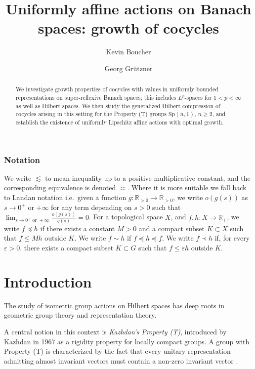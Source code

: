 \documentclass[12pt]{amsart}
\title{Uniformly affine actions on Banach spaces: growth of cocycles }
\author[K. Boucher]{Kevin Boucher}
\author[G. Grützner]{Georg Grützner}
\theoremstyle{definition}
\begin{document}
\maketitle
\begin{abstract}
We investigate growth properties of cocycles with values in uniformly bounded representations on super-reflexive Banach spaces; this includes $L^p$-spaces for $1<p<\infty$ as well as Hilbert spaces.
We then study the generalized Hilbert compression of cocycles arising in this setting for the Property (T) groups $\mathrm{Sp}(n,1)$, $n\ge 2$, and establish the existence of uniformly Lipschitz affine actions with optimal growth.\end{abstract}
\subsubsection*{Notation}


We write \(\lesssim\) to mean inequality up to a positive multiplicative
constant, and the corresponding equivalence is denoted
\(\asymp\).
Where it is more suitable we fall back to Landau
  notation i.e.~given a function
  \(g: \mathbb{R}_{>0} \to \mathbb{R}_{>0}\), we write \(o(g(s))\) as
  \(s \to 0^+\) or \(+\infty\) for any term depending on \(s > 0\) such
  that \(\lim_{s \to 0^+\text{ or } +\infty} \frac{o(g(s))}{g(s)} = 0\).
For a topological space \(X\), and
\(f, h: X \rightarrow \mathbb{R}_{+}\), we write \(f \preceq h\) if
there exists a constant \(M > 0\) and a compact subset \(K \subset X\)
such that \(f \leq M h\) outside \(K\). We write \(f \sim h\) if
\(f \preceq h \preceq f\). We write \(f \prec h\) if, for every
\(\varepsilon>0\), there exists a compact subset \(K \subset G\) such
that \(f \leq \varepsilon h\) outside \(K\).




\section{Introduction}
\label{sec:introduction}

The study of isometric group actions on Hilbert spaces has deep roots in
geometric group theory and representation theory.

A central notion in this context is \emph{Kazhdan's Property (T)},
introduced by Kazhdan in 1967 as a rigidity property for locally compact
groups. A group with Property (T) is characterized by the fact that
every unitary representation admitting almost invariant vectors must
contain a non-zero invariant vector \cite{Kazhdan1967}.
\end{document}
